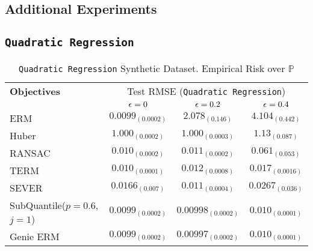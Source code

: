 \documentclass{article} %
\newcommand{\subhead}[1]{\multicolumn{1}{c}{#1}}%
\begin{document}
\begin{appendices}
	\newpage
	
	\section{Additional Experiments}
	\label{app:additional-experiments}
	\subsection{\texttt{Quadratic Regression}}
	\begin{table}[!h]
	\centering
	\begin{tabular}{lccc}
		\toprule 
		\textbf{Objectives}&\multicolumn{3}{c}{Test RMSE (\texttt{Quadratic Regression})}\\                   
		\cmidrule(rl){2-4}
		&\subhead{${\epsilon} = 0$}& \subhead{${\epsilon} = 0.2$}& \subhead{${\epsilon} = 0.4$}\\ 
		\midrule
		ERM  &$0.0099_{(0.0002)}$&$2.078_{(0.146)}$&$4.104_{(0.442)}$\\
		Huber \cite{Huber2009} &$1.000_{(0.0002)}$&$1.000_{(0.0003)}$&$1.13_{(0.087)}$\\
		RANSAC \cite{RANSAC1981} &$0.010_{(0.0002)}$&$0.011_{(0.0002)}$&$0.061_{(0.053)}$\\
		TERM \cite{li2020tilted} &$0.010_{(0.0001)}$&$0.012_{(0.0008)}$&$0.017_{(0.0016)}$\\
		SEVER \cite{DiakonikolasKKLSS19} &$0.0166_{(0.007)}$&$0.011_{(0.0004)}$&$0.0267_{(0.036)}$\\
		\rowcolor{LightCyan}
		SubQuantile($p = 0.6$,$j=1$) &$\mathbf{0.0099_{(0.0002)}}$&$\mathbf{0.00998_{(0.0002)}}$&$\mathbf{0.010_{(0.0001)}}$\\
		\midrule 
		Genie ERM &$0.0099_{(0.0002)}$&$0.00997_{(0.0002)}$&$0.010_{(0.0001)}$\\
		\bottomrule
	\end{tabular}
	\caption{\texttt{Quadratic Regression} Synthetic Dataset. Empirical Risk over $\mathbb{P}$}
	\label{tab:quadratic-regression}
	\end{table}


\end{appendices}
\end{document}
